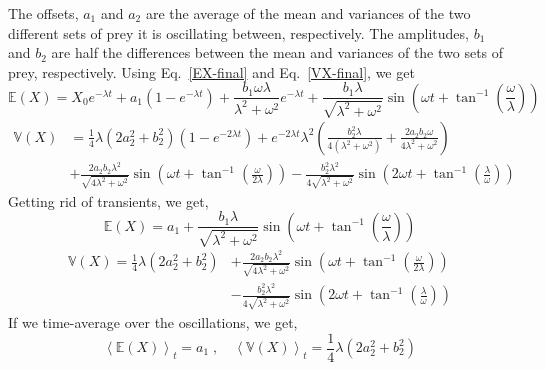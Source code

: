 \documentclass[12pt]{iopart}
\begin{document}
 The offsets, $a_1$ and $a_2$ are the average of the mean and variances of the two different sets of prey it is oscillating between, respectively. The amplitudes, $b_1$ and $b_2$ are half the differences between the mean and variances of the two sets of prey, respectively. 
Using Eq.~\eqref{EX-final} and Eq.~\eqref{VX-final}, we get
\begin{equation}
\label{EX-sin-full}
\mathbb{E}(X) = X_0 e^{-\lambda t} + a_1\left(1-e^{-\lambda t}\right) + \frac{b_1\omega\lambda}{\lambda^2+\omega^2} e^{-\lambda t} + \frac{b_1 \lambda}{\sqrt{\lambda^2+\omega^2}} \sin{\left(\omega t + \tan^{-1}{\left(\frac{\omega}{\lambda}\right)}\right)}
\end{equation}
\begin{align}
\label{VX-sin-full}
\mathbb{V}(X) &= \frac{1}{4}\lambda\left(2 a_2^2 + b_2^2\right)\left(1-e^{-2\lambda t}\right) +e^{-2\lambda t}\lambda^2\left(\frac{b_2^2\lambda}{4(\lambda^2+\omega^2)}+\frac{2 a_2 b_2 \omega}{4\lambda^2 + \omega^2}\right) \nonumber \\
&+ \frac{2 a_2 b_2 \lambda^2}{\sqrt{4\lambda^2+\omega^2}} \sin{\left(\omega t + \tan^{-1}{\left(\frac{\omega}{2\lambda}\right)}\right)}-\frac{b_2^2\lambda^2}{4\sqrt{\lambda^2+\omega^2}} \sin{\left(2 \omega t + \tan^{-1}{\left(\frac{\lambda}{\omega}\right)}\right)}
\end{align}
Getting rid of transients, we get,
\begin{equation}
\label{EX-sin}
\mathbb{E}(X) = a_1 + \frac{b_1 \lambda}{\sqrt{\lambda^2+\omega^2}} \sin{\left(\omega t + \tan^{-1}{\left(\frac{\omega}{\lambda}\right)}\right)}
\end{equation}
\begin{align}
\label{VX-sin}
\mathbb{V}(X) = \frac{1}{4}\lambda\left(2 a_2^2 + b_2^2\right) &+ \frac{2 a_2 b_2 \lambda^2}{\sqrt{4\lambda^2+\omega^2}} \sin{\left(\omega t + \tan^{-1}{\left(\frac{\omega}{2\lambda}\right)}\right)} \nonumber \\ &- \frac{b_2^2\lambda^2}{4\sqrt{\lambda^2+\omega^2}} \sin{\left(2 \omega t + \tan^{-1}{\left(\frac{\lambda}{\omega}\right)}\right)}
\end{align}
If we time-average over the oscillations, we get,
\begin{equation}
\label{EX-VX-sin-timeaverage}
\left\langle \mathbb{E}(X)\right\rangle_t = a_1\;,\quad \left\langle\mathbb{V}(X)\right\rangle_t = \frac{1}{4}\lambda\left(2 a_2^2+b_2^2\right)
\end{equation}
\end{document}
